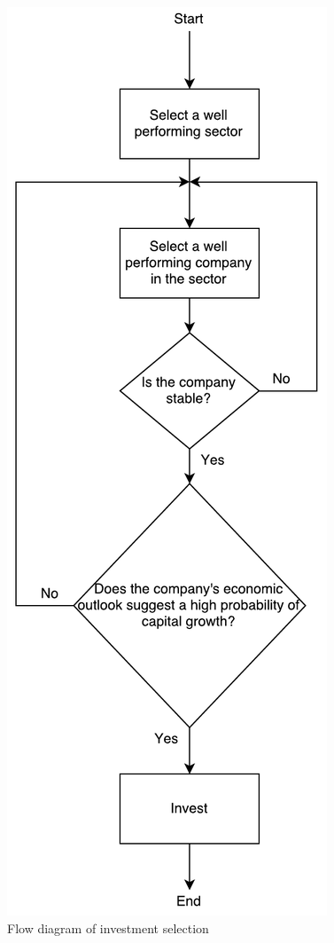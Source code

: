\documentclass[letterpaper, 10 pt, conference]{ieeeconf}  %
\begin{document}
\begin{figure}[h!]
\centering
\includegraphics[scale=0.5]{decisions.pdf}
\caption{Flow diagram of investment selection}
\label{fig:flowChart}
\end{figure}
\end{document}
